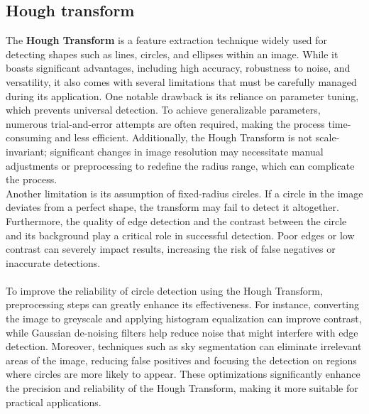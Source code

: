 \documentclass[10pt,conference,a4paper]{IEEEtran}
\begin{document}
\subsection{Hough transform}
The \textbf{Hough Transform} is a feature extraction technique widely used for detecting shapes such as lines, circles, and ellipses within an image. While it boasts significant advantages, including high accuracy, robustness to noise, and versatility, it also comes with several limitations that must be carefully managed during its application. One notable drawback is its reliance on parameter tuning, which prevents universal detection. To achieve generalizable parameters, numerous trial-and-error attempts are often required, making the process time-consuming and less efficient. Additionally, the Hough Transform is not scale-invariant; significant changes in image resolution may necessitate manual adjustments or preprocessing to redefine the radius range, which can complicate the process.\\
Another limitation is its assumption of fixed-radius circles. If a circle in the image deviates from a perfect shape, the transform may fail to detect it altogether. Furthermore, the quality of edge detection and the contrast between the circle and its background play a critical role in successful detection. Poor edges or low contrast can severely impact results, increasing the risk of false negatives or inaccurate detections.\\\\
To improve the reliability of circle detection using the Hough Transform, preprocessing steps can greatly enhance its effectiveness. For instance, converting the image to greyscale and applying histogram equalization can improve contrast, while Gaussian de-noising filters help reduce noise that might interfere with edge detection. Moreover, techniques such as sky segmentation can eliminate irrelevant areas of the image, reducing false positives and focusing the detection on regions where circles are more likely to appear. These optimizations significantly enhance the precision and reliability of the Hough Transform, making it more suitable for practical applications.
\end{document}

